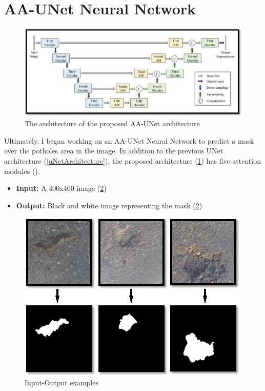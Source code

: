 \documentclass[runningheads,a4paper,11pt]{report}
\begin{document}
\newpage
\section{AA-UNet Neural Network}
\label{section:uNet}

\begin{figure}[htbp]
    \centerline{\includegraphics{assets/aAUNetArchitecture.png}}  
    \caption{The architecture of the proposed AA-UNet architecture}
    \label{aAUNetArchitecture}
\end{figure}

Ultimately, I began working on an AA-UNet Neural Network to predict a mask over the potholes area in the image. In addition to the previous UNet architecture (\ref{uNetArchitecture}), the proposed architecture (\ref{aAUNetArchitecture}) has five attention modules ().
\begin{itemize}
	\item \textbf{Input:} A 400x400 image (\ref{uNetExamples})
	\item \textbf{Output:} Black and white image representing the mask (\ref{uNetExamples})
\end{itemize}

\begin{figure}[htbp]
    \centerline{\includegraphics{assets/uNetExamples.png}}  
    \caption{Input-Output examples}
    \label{uNetExamples}
\end{figure}
\end{document}
